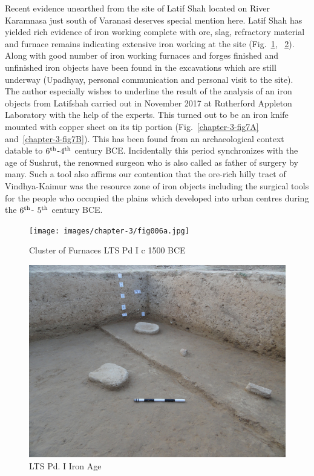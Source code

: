 Recent evidence unearthed from the site of Latif Shah located on River Karamnasa just south of Varanasi deserves special mention here. Latif Shah has yielded rich evidence of iron working complete with ore, slag, refractory material and furnace remains indicating extensive iron working at the site (Fig.~\ref{chapter-3-fig6A}, ~\ref{chapter-3-fig6B}). Along with good number of iron working furnaces and forges finished and unfinished iron objects have been found in the excavations which are still underway (Upadhyay, personal communication and personal visit to the site). The author especially wishes to underline the result of the analysis of an iron objects from Latifshah carried out in November 2017 at Rutherford Appleton Laboratory with the help of the experts. This turned out to be an iron knife mounted with copper sheet on its tip portion (Fig.~\ref{chapter-3-fig7A} and~\ref{chapter-3-fig7B}). This has been found from an archaeological context datable to $6^{\rm th}$-$4^{\rm th}$ century BCE. Incidentally this period synchronizes with the age of Sushrut, the renowned surgeon who is also called as father of surgery by many. Such a tool also affirms our contention that the ore-rich hilly tract of Vindhya-Kaimur was the resource zone of iron objects including the surgical tools for the people who occupied the plains which developed into urban centres during the $6^{\rm th}$- $5^{\rm th}$ century BCE.

\begin{figure}[H]
\renewcommand{\thefigure}{6A}
\texttt{[image: images/chapter-3/fig006a.jpg]}
\caption{Cluster of Furnaces LTS Pd I c 1500 BCE}\label{chapter-3-fig6A}
\end{figure}

\begin{figure}[H]
\renewcommand{\thefigure}{6B}
\includegraphics[scale=1.5]{images/chapter-3/fig006b.jpg}
\caption{LTS Pd. I Iron Age}\label{chapter-3-fig6B}
\end{figure}

